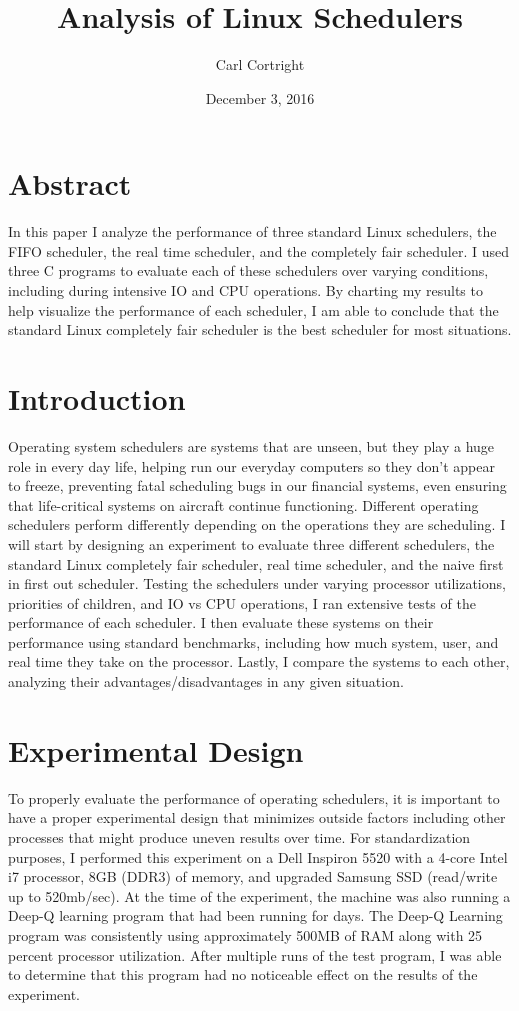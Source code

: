 \documentclass{article}
\title{Analysis of Linux Schedulers}
\author{Carl Cortright}
\date{December 3, 2016}
\begin{document}
\maketitle

\section{Abstract}

In this paper I analyze the performance of three standard Linux schedulers, the FIFO scheduler, the real time scheduler, and the completely fair scheduler. I used three C programs to evaluate each of these schedulers over varying conditions, including during intensive IO and CPU operations. By charting my results to help visualize the performance of each scheduler, I am able to conclude that the standard Linux completely fair scheduler is the best scheduler for most situations.

\section{Introduction}

Operating system schedulers are systems that are unseen, but they play a huge role in every day life, helping run our everyday computers so they don’t appear to freeze, preventing fatal scheduling bugs in our financial systems, even ensuring that life-critical systems on aircraft continue functioning. Different operating schedulers perform differently depending on the operations they are scheduling. I will start by designing an experiment to evaluate three different schedulers, the standard Linux completely fair scheduler, real time scheduler, and the naive first in first out scheduler. Testing the schedulers under varying processor utilizations, priorities of children, and IO vs CPU operations, I ran extensive tests of the performance of each scheduler. I then evaluate these systems on their performance using standard benchmarks, including how much system, user, and real time they take on the processor. Lastly, I compare the systems to each other, analyzing their advantages/disadvantages in any given situation.

\section{Experimental Design}

To properly evaluate the performance of operating schedulers, it is important to have a proper experimental design that minimizes outside factors including other processes that might produce uneven results over time. For standardization purposes, I performed this experiment on a Dell Inspiron 5520 with a 4-core Intel i7 processor, 8GB (DDR3) of memory, and upgraded Samsung SSD (read/write up to 520mb/sec). At the time of the experiment, the machine was also running a Deep-Q learning program that had been running for days. The Deep-Q Learning program was consistently using approximately 500MB of RAM along with 25 percent processor utilization. After multiple runs of the test program, I was able to determine that this program had no noticeable effect on the results of the experiment.
\end{document}
